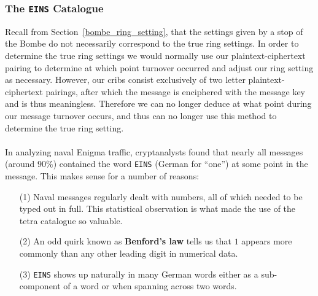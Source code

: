   \subsubsection{The \texttt{EINS} Catalogue}
  Recall from Section~\ref{bombe_ring_setting}, that the settings
  given by a stop of the Bombe do not necessarily correspond to the
  true ring settings. In order to determine the true ring settings we
  would normally use our plaintext-ciphertext pairing to determine at
  which point turnover occurred and adjust our ring setting as
  necessary. However, our cribs consist exclusively of two letter
  plaintext-ciphertext pairings, after which the message is
  enciphered with the message key and is thus meaningless. Therefore
  we can no longer deduce at what point during our message turnover
  occurs, and thus can no longer use this method to determine the true
  ring setting.
  \\\\In analyzing naval Enigma traffic, cryptanalysts found that
  nearly all messages (around $90\%$) contained the word
  \texttt{EINS} (German for ``one'') at some point in the message.
  This makes sense for a number of reasons:
  \begin{enumerate}
    \item[(1)] Naval messages regularly dealt with numbers, all of which
      needed to be typed out in full. This statistical observation is
      what made the use of the tetra catalogue so valuable.
    \item[(2)] An odd quirk known as {\bf{Benford's law}} tells us that
      $1$ appears more commonly than any other leading digit in numerical data.
    \item[(3)] \texttt{EINS} shows up naturally in many German words
      either as a sub-component of a word or when spanning across two words.
  \end{enumerate}

